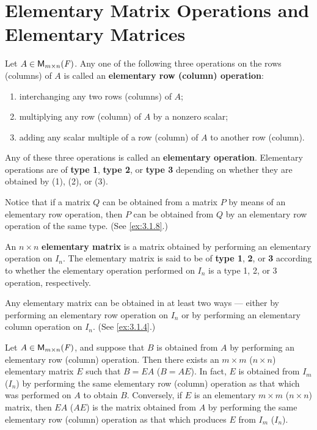 \section{Elementary Matrix Operations and Elementary Matrices}\label{sec:3.1}

\begin{defn}\label{3.1.1}
  Let \(A \in \mathsf{M}_{{m} \times n}({\mathit{F}})\).
  Any one of the following three operations on the rows (columns) of \(A\) is called an \textbf{elementary row (column) operation}:
  \begin{enumerate}[label=(\arabic*)]
    \item interchanging any two rows (columns) of \(A\);
    \item multiplying any row (column) of \(A\) by a nonzero scalar;
    \item adding any scalar multiple of a row (column) of \(A\) to another row (column).
  \end{enumerate}
  Any of these three operations is called an \textbf{elementary operation}.
  Elementary operations are of \textbf{type 1}, \textbf{type 2}, or \textbf{type 3} depending on whether they are obtained by (1), (2), or (3).
\end{defn}

\begin{note}
  Notice that if a matrix \(Q\) can be obtained from a matrix \(P\) by means of an elementary row operation, then \(P\) can be obtained from \(Q\) by an elementary row operation of the same type.
  (See \cref{ex:3.1.8}.)
\end{note}

\begin{defn}\label{3.1.2}
  An \(n \times n\) \textbf{elementary matrix} is a matrix obtained by performing an elementary operation on \(I_n\).
  The elementary matrix is said to be of \textbf{type 1}, \textbf{2}, or \textbf{3} according to whether the elementary operation performed on \(I_n\) is a type 1, 2, or 3 operation, respectively.
\end{defn}

\begin{note}
  Any elementary matrix can be obtained in at least two ways ---
  either by performing an elementary row operation on \(I_n\) or by performing an elementary column operation on \(I_n\).
  (See \cref{ex:3.1.4}.)
\end{note}

\begin{thm}\label{3.1}
  Let \(A \in \mathsf{M}_{{m} \times n}({\mathit{F}})\), and suppose that \(B\) is obtained from \(A\) by performing an elementary row (column) operation.
  Then there exists an \(m \times m\) (\(n \times n\)) elementary matrix \(E\) such that \(B = EA\) (\(B = AE\)).
  In fact, \(E\) is obtained from \(I_m\) (\(I_n\)) by performing the same elementary row (column) operation as that which was performed on \(A\) to obtain \(B\).
  Conversely, if \(E\) is an elementary \(m \times m\) (\(n \times n\)) matrix, then \(EA\) (\(AE\)) is the matrix obtained from \(A\) by performing the same elementary row (column) operation as that which produces \(E\) from \(I_m\) (\(I_n\)).
\end{thm}

